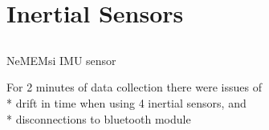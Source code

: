 \section{Inertial Sensors}



\subsection{}
{

\begin{frame}{NeMEMsi IMU sensor}
    \begin{figure}
   \end{figure}
\vspace{-5mm}
For 2 minutes of data collection there were issues of \\
* drift in time when using 4 inertial sensors, and \\ 
* disconnections to bluetooth module




\end{frame}
}



%
%
%
%
%
%
%
%
%



